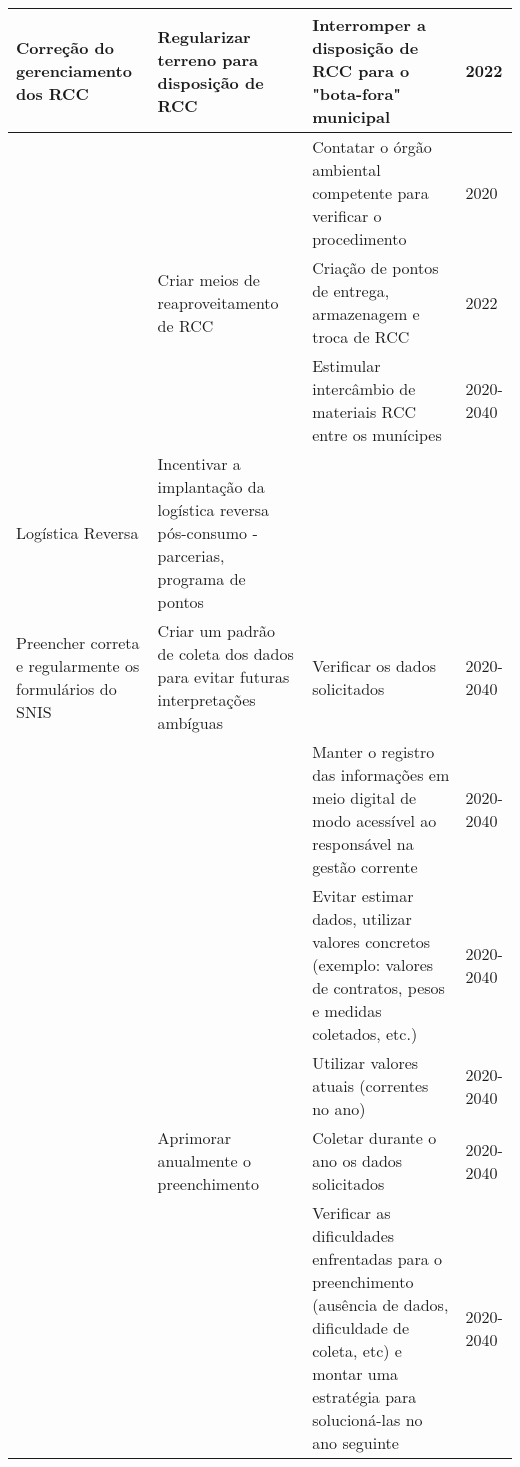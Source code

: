 \begin{table}
\begin{tabular}{|P{6.145em} | P{16.575em} | P{12.355em} | P{5.645em}|}
		\midrule
		Correção do gerenciamento dos RCC & Regularizar terreno para disposição de RCC & Interromper a disposição de RCC para o "bota-fora" municipal & 2022 \\
		\midrule
		&       & Contatar o órgão ambiental competente para verificar o procedimento & 2020 \\
		\midrule
		& Criar meios de reaproveitamento de RCC & Criação de pontos de entrega, armazenagem e troca de RCC & 2022 \\
		\midrule
		&       & Estimular intercâmbio de materiais RCC entre os munícipes & 2020-2040 \\
		\midrule
		Logística Reversa & Incentivar a implantação da logística reversa pós-consumo - parcerias, programa de pontos &   &   \\
		\midrule
		Preencher correta e regularmente os formulários do SNIS & Criar um padrão de coleta dos dados para evitar futuras interpretações ambíguas & Verificar os dados solicitados & 2020-2040 \\
		\midrule
		&       & Manter o registro das informações em meio digital de modo acessível ao responsável na gestão corrente & 2020-2040 \\
		\midrule
		&       & Evitar estimar dados, utilizar valores concretos (exemplo: valores de contratos, pesos e medidas coletados, etc.) & 2020-2040 \\
		\midrule
		&       & Utilizar valores atuais (correntes no ano) & 2020-2040 \\
		\midrule
		& Aprimorar anualmente o preenchimento & Coletar durante o ano os dados solicitados & 2020-2040 \\
		\midrule
		&       & Verificar as dificuldades enfrentadas para o preenchimento (ausência de dados, dificuldade de coleta, etc) e montar uma estratégia para solucioná-las no ano seguinte & 2020-2040 \\
		\bottomrule
	\end{tabular}%
\end{table}%
